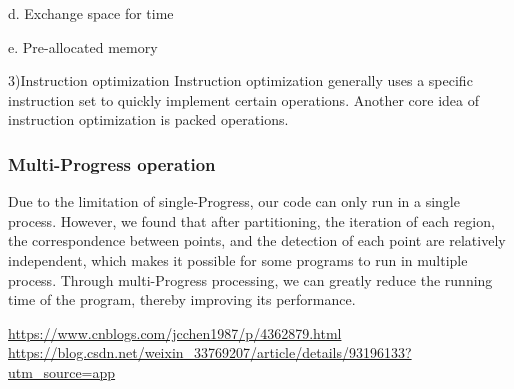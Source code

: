 \documentclass{apmcmthesis}
\begin{document}
d. Exchange space for time


e. Pre-allocated memory


3)Instruction optimization
Instruction optimization generally uses a specific instruction set to quickly implement certain operations. Another core idea of instruction optimization is packed operations.

\subsubsection{Multi-Progress operation}
Due to the limitation of single-Progress, our code can only run in a single process. However, we found that after partitioning, the iteration of each region, the correspondence between points, and the detection of each point are relatively independent, which makes it possible for some programs to run in multiple process. Through multi-Progress processing, we can greatly reduce the running time of the program, thereby improving its performance.




\begin{thebibliography}{9}%
      \url{https://www.cnblogs.com/jcchen1987/p/4362879.html}
      \url{https://blog.csdn.net/weixin_33769207/article/details/93196133?utm_source=app}
\end{thebibliography}

\newpage
\end{document}
